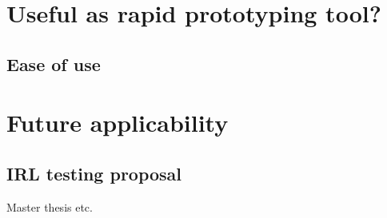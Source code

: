 \section{Useful as rapid prototyping tool?}

\subsection{Ease of use}

\section{Future applicability}
\subsection{IRL testing proposal}
Master thesis etc.